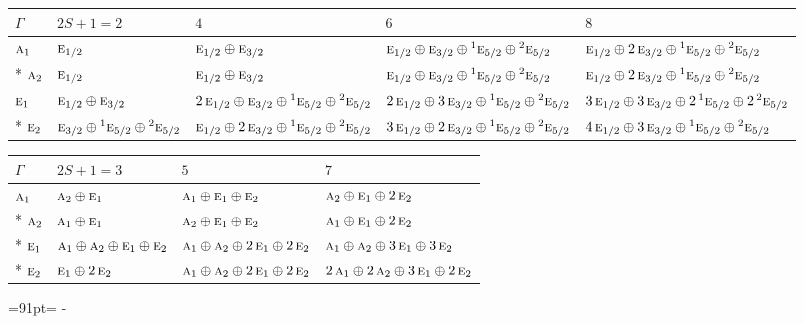 \documentclass[10pt,a4paper]{article}
\newcommand{\needspace}[1]{\par\penalty-100\begingroup\dimen0=#1\relax\dimen2=\pagegoal
  \advance\dimen2-\pagetotal\ifdim\dimen0>\dimen2\relax\ifdim\dimen2>0pt\vfil\break\fi\fi
  \endgroup}
\numberwithin{equation}{section}
\newcommand{\irr}[1]{\text{\normalfont\scshape #1}}
\newcommand{\conjpair}[1]{{}^{#1}}
\begin{document}
{\small\setlength{\tabcolsep}{3pt}\begin{longtable}{@{}l>{\RaggedRight\arraybackslash}p{}>{\RaggedRight\arraybackslash}p{}>{\RaggedRight\arraybackslash}p{}>{\RaggedRight\arraybackslash}p{}@{}}\toprule
$\Gamma$ & $2S + 1 = 2$ & $4$ & $6$ & $8$\\\midrule\endhead
\bottomrule\endfoot\endlastfoot
$\irr{a}_{1}$ & $\irr{e}_{1/2}$ & $\irr{e}_{1/2}\oplus \irr{e}_{3/2}$ & $\irr{e}_{1/2}\oplus \irr{e}_{3/2}\oplus \conjpair{1}\irr{e}_{5/2}\oplus \conjpair{2}\irr{e}_{5/2}$ & $\irr{e}_{1/2}\oplus 2\,\irr{e}_{3/2}\oplus \conjpair{1}\irr{e}_{5/2}\oplus \conjpair{2}\irr{e}_{5/2}$\\*
$\irr{a}_{2}$ & $\irr{e}_{1/2}$ & $\irr{e}_{1/2}\oplus \irr{e}_{3/2}$ & $\irr{e}_{1/2}\oplus \irr{e}_{3/2}\oplus \conjpair{1}\irr{e}_{5/2}\oplus \conjpair{2}\irr{e}_{5/2}$ & $\irr{e}_{1/2}\oplus 2\,\irr{e}_{3/2}\oplus \conjpair{1}\irr{e}_{5/2}\oplus \conjpair{2}\irr{e}_{5/2}$\\
$\irr{e}_{1}$ & $\irr{e}_{1/2}\oplus \irr{e}_{3/2}$ & $2\,\irr{e}_{1/2}\oplus \irr{e}_{3/2}\oplus \conjpair{1}\irr{e}_{5/2}\oplus \conjpair{2}\irr{e}_{5/2}$ & $2\,\irr{e}_{1/2}\oplus 3\,\irr{e}_{3/2}\oplus \conjpair{1}\irr{e}_{5/2}\oplus \conjpair{2}\irr{e}_{5/2}$ & $3\,\irr{e}_{1/2}\oplus 3\,\irr{e}_{3/2}\oplus 2\,\conjpair{1}\irr{e}_{5/2}\oplus 2\,\conjpair{2}\irr{e}_{5/2}$\\*
$\irr{e}_{2}$ & $\irr{e}_{3/2}\oplus \conjpair{1}\irr{e}_{5/2}\oplus \conjpair{2}\irr{e}_{5/2}$ & $\irr{e}_{1/2}\oplus 2\,\irr{e}_{3/2}\oplus \conjpair{1}\irr{e}_{5/2}\oplus \conjpair{2}\irr{e}_{5/2}$ & $3\,\irr{e}_{1/2}\oplus 2\,\irr{e}_{3/2}\oplus \conjpair{1}\irr{e}_{5/2}\oplus \conjpair{2}\irr{e}_{5/2}$ & $4\,\irr{e}_{1/2}\oplus 3\,\irr{e}_{3/2}\oplus \conjpair{1}\irr{e}_{5/2}\oplus \conjpair{2}\irr{e}_{5/2}$\\
\bottomrule\end{longtable}}
{\small\setlength{\tabcolsep}{3pt}\begin{longtable}{@{}llll@{}}\toprule
$\Gamma$ & $2S + 1 = 3$ & $5$ & $7$\\\midrule\endhead
\bottomrule\endfoot\endlastfoot
$\irr{a}_{1}$ & $\irr{a}_{2}\oplus \irr{e}_{1}$ & $\irr{a}_{1}\oplus \irr{e}_{1}\oplus \irr{e}_{2}$ & $\irr{a}_{2}\oplus \irr{e}_{1}\oplus 2\,\irr{e}_{2}$\\*
$\irr{a}_{2}$ & $\irr{a}_{1}\oplus \irr{e}_{1}$ & $\irr{a}_{2}\oplus \irr{e}_{1}\oplus \irr{e}_{2}$ & $\irr{a}_{1}\oplus \irr{e}_{1}\oplus 2\,\irr{e}_{2}$\\*
$\irr{e}_{1}$ & $\irr{a}_{1}\oplus \irr{a}_{2}\oplus \irr{e}_{1}\oplus \irr{e}_{2}$ & $\irr{a}_{1}\oplus \irr{a}_{2}\oplus 2\,\irr{e}_{1}\oplus 2\,\irr{e}_{2}$ & $\irr{a}_{1}\oplus \irr{a}_{2}\oplus 3\,\irr{e}_{1}\oplus 3\,\irr{e}_{2}$\\*
$\irr{e}_{2}$ & $\irr{e}_{1}\oplus 2\,\irr{e}_{2}$ & $\irr{a}_{1}\oplus \irr{a}_{2}\oplus 2\,\irr{e}_{1}\oplus 2\,\irr{e}_{2}$ & $2\,\irr{a}_{1}\oplus 2\,\irr{a}_{2}\oplus 3\,\irr{e}_{1}\oplus 2\,\irr{e}_{2}$\\
\bottomrule\end{longtable}}
\needspace{91pt}
\end{document}

